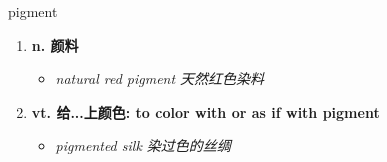 
\begin{frame}
{\huge pigment}
\begin{center}
\begin{enumerate}\Large
  \item \textbf{n. 颜料}
  \begin{itemize}
    \item \em{\Large{natural red pigment 天然红色染料}}
  \end{itemize}
  \item \textbf{vt. 给...上颜色: to color with or as if with pigment}
  \begin{itemize}
    \item \em{\Large{pigmented silk 染过色的丝绸}}
  \end{itemize}
\end{enumerate}
\end{center}
\end{frame}
